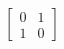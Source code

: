\documentclass[preview]{standalone}
\begin{document}
\begin{align*}
\begin{bmatrix} 0 & 1 \\ 1 & 0 \end{bmatrix}
\end{align*}
\end{document}
